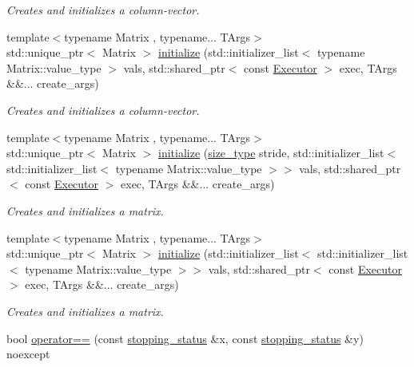\begin{DoxyCompactItemize}
\begin{DoxyCompactList}\small\item\em Creates and initializes a column-\/vector. \end{DoxyCompactList}\item 
{\footnotesize template$<$typename Matrix , typename... T\+Args$>$ }\\std\+::unique\+\_\+ptr$<$ Matrix $>$ \hyperlink{group__LinOp_gaac5f7b4ff3b43dbc6918c687dd7d2d2e}{initialize} (std\+::initializer\+\_\+list$<$ typename Matrix\+::value\+\_\+type $>$ vals, std\+::shared\+\_\+ptr$<$ const \hyperlink{classgko_1_1Executor}{Executor} $>$ exec, T\+Args \&\&... create\+\_\+args)
\begin{DoxyCompactList}\small\item\em Creates and initializes a column-\/vector. \end{DoxyCompactList}\item 
{\footnotesize template$<$typename Matrix , typename... T\+Args$>$ }\\std\+::unique\+\_\+ptr$<$ Matrix $>$ \hyperlink{group__LinOp_gaaf2520e5921e1bea00853c290f4fc28f}{initialize} (\hyperlink{namespacegko_a6e5c95df0ae4e47aab2f604a22d98ee7}{size\+\_\+type} stride, std\+::initializer\+\_\+list$<$ std\+::initializer\+\_\+list$<$ typename Matrix\+::value\+\_\+type $>$$>$ vals, std\+::shared\+\_\+ptr$<$ const \hyperlink{classgko_1_1Executor}{Executor} $>$ exec, T\+Args \&\&... create\+\_\+args)
\begin{DoxyCompactList}\small\item\em Creates and initializes a matrix. \end{DoxyCompactList}\item 
{\footnotesize template$<$typename Matrix , typename... T\+Args$>$ }\\std\+::unique\+\_\+ptr$<$ Matrix $>$ \hyperlink{group__LinOp_gabe4ff67be5b3aae4e981b33ea9883385}{initialize} (std\+::initializer\+\_\+list$<$ std\+::initializer\+\_\+list$<$ typename Matrix\+::value\+\_\+type $>$$>$ vals, std\+::shared\+\_\+ptr$<$ const \hyperlink{classgko_1_1Executor}{Executor} $>$ exec, T\+Args \&\&... create\+\_\+args)
\begin{DoxyCompactList}\small\item\em Creates and initializes a matrix. \end{DoxyCompactList}\item 
bool \hyperlink{namespacegko_acf34f605deac3e475189bb5b8a0fa71a}{operator==} (const \hyperlink{classgko_1_1stopping__status}{stopping\+\_\+status} \&x, const \hyperlink{classgko_1_1stopping__status}{stopping\+\_\+status} \&y) noexcept

\end{DoxyCompactItemize}

